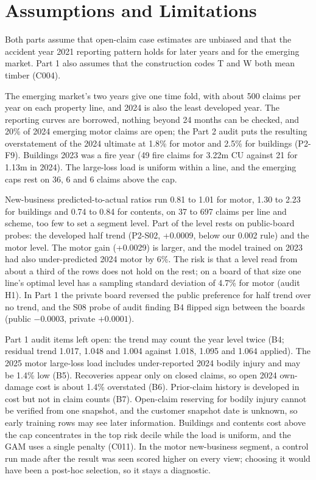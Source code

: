 \documentclass{rapport}
\begin{document}
\clearpage
\section{Assumptions and Limitations}
\label{ov:app-lim}

Both parts assume that open-claim case estimates are unbiased and that the accident year 2021 reporting pattern holds
for later years and for the emerging market. Part 1 also assumes that the construction codes T and W both mean timber
(C004).

The emerging market's two years give one time fold, with about 500 claims per year on each property line, and 2024 is
also the least developed year. The reporting curves are borrowed, nothing beyond 24 months can be checked, and 20\% of
2024 emerging motor claims are open; the Part 2 audit puts the resulting overstatement of the 2024 ultimate at 1.8\%
for motor and 2.5\% for buildings (P2-F9). Buildings 2023 was a fire year (49 fire claims for 3.22m CU against 21 for
1.13m in 2024). The large-loss load is uniform within a line, and the emerging caps rest on 36, 6 and 6 claims above
the cap.

New-business predicted-to-actual ratios run 0.81 to 1.01 for motor, 1.30 to 2.23 for buildings and 0.74 to 0.84 for
contents, on 37 to 697 claims per line and scheme, too few to set a segment level. Part of the level rests on
public-board probes: the developed half trend (P2-S02, +0.0009, below our 0.002 rule) and the motor level. The motor
gain (+0.0029) is larger, and the model trained on 2023 had also under-predicted 2024 motor by 6\%. The risk is that a
level read from about a third of the rows does not hold on the rest; on a board of that size one line's optimal level
has a sampling standard deviation of 4.7\% for motor (audit H1). In Part 1 the private board reversed the public
preference for half trend over no trend, and the S08 probe of audit finding B4 flipped sign between the boards (public
$-0.0003$, private $+0.0001$).

Part 1 audit items left open: the trend may count the year level twice (B4; residual trend 1.017, 1.048 and 1.004
against 1.018, 1.095 and 1.064 applied). The 2025 motor large-loss load includes under-reported 2024 bodily injury and
may be 1.4\% low (B5). Recoveries appear only on closed claims, so open 2024 own-damage cost is about 1.4\% overstated
(B6). Prior-claim history is developed in cost but not in claim counts (B7). Open-claim reserving for bodily injury
cannot be verified from one snapshot, and the customer snapshot date is unknown, so early training rows may see later
information. Buildings and contents cost above the cap concentrates in the top risk decile while the load is uniform,
and the GAM uses a single penalty (C011). In the motor new-business segment, a control run made after the result was
seen scored higher on every view; choosing it would have been a post-hoc selection, so it stays a diagnostic.
\end{document}
